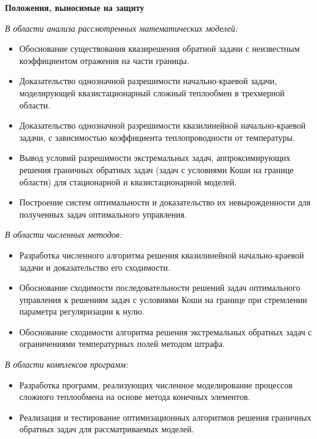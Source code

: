 \begin{frame}
    \textbf{Положения, выносимые на защиту}

    \textit{В области анализа рассмотренных математических моделей:}
    \begin{itemize}
        \item Обоснование существования квазирешения обратной задачи с неизвестным
        коэффициентом отражения на части границы.
        \item Доказательство однозначной разрешимости начально-краевой задачи,
        моделирующей квазистационарный сложный теплообмен в трехмерной
        области.
        \item Доказательство однозначной разрешимости квазилинейной начально-краевой задачи,
        с зависимостью коэффициента теплопроводности от температуры.
        \item Вывод условий разрешимости экстремальных задач, аппроксимирующих
        решения граничных обратных задач (задач с условиями Коши на границе области)
        для стационарной и квазистационарной моделей.
        \item Построение систем оптимальности и доказательство их невырожденности
        для полученных задач оптимального управления.
    \end{itemize}
        \textit{В области численных методов:}
    \begin{itemize}
        \item Разработка численного алгоритма решения квазилинейной начально-краевой задачи
        и доказательство его сходимости.
        \item Обоснование сходимости последовательности решений задач оптимального
        управления к решениям задач с условиями Коши на границе при
        стремлении параметра регуляризации к нулю.
        \item Обоснование сходимости алгоритма решения экстремальных обратных
        задач с ограничениями температурных полей методом штрафа.
    \end{itemize}

    \textit{В области комплексов программ:}
    \begin{itemize}
        \item Разработка программ, реализующих численное моделирование процессов
        сложного теплообмена на основе метода конечных элементов.
        \item Реализация и тестирование оптимизационных алгоритмов решения
        граничных обратных задач для рассматриваемых моделей.
    \end{itemize}
\end{frame}




